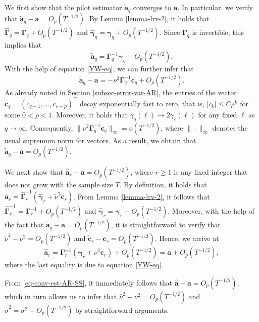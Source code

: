We first show that the pilot estimator $\widetilde{\boldsymbol{a}}_q$ converges to $\boldsymbol{a}$. In particular, we verify that $\widetilde{\boldsymbol{a}}_q - \boldsymbol{a} = O_p(T^{-1/2})$. By Lemma \ref{lemma-lrv-2}, it holds that $\widehat{\boldsymbol{\Gamma}}_q = \boldsymbol{\Gamma}_q + O_p(T^{-1/2})$ and $\widehat{\boldsymbol{\gamma}}_q = \boldsymbol{\gamma}_q + O_p(T^{-1/2})$. Since $\boldsymbol{\Gamma}_q$ is invertible, this implies that 
\[ \widetilde{\boldsymbol{a}}_q = \boldsymbol{\Gamma}_q^{-1} \boldsymbol{\gamma}_q + O_p(T^{-1/2}). \]
With the help of equation \eqref{YW-eq}, we can further infer that 
\[ \widetilde{\boldsymbol{a}}_q - \boldsymbol{a} = -\nu^2 \boldsymbol{\Gamma}_q^{-1} \boldsymbol{c}_q + O_p(T^{-1/2}). \]
As already noted in Section \ref{subsec-error-var-AR}, the entries of the vector $\boldsymbol{c}_q = (c_{q-1},\ldots,c_{c-p})^\top$ decay exponentially fast to zero, that is, $|c_k| \le C \rho^k$ for some $0 < \rho < 1$. Moreover, it holds that $\gamma_q(\ell) \rightarrow 2 \gamma_\varepsilon(\ell)$ for any fixed $\ell$ as $q \rightarrow \infty$. Consequently, $\| \nu^2 \boldsymbol{\Gamma}_q^{-1} \boldsymbol{c}_q \|_\infty = o(T^{-1/2})$, where $\| \cdot \|_\infty$ denotes the usual supremum norm for vectors. As a result, we obtain that $\widetilde{\boldsymbol{a}}_q - \boldsymbol{a} = O_p(T^{-1/2})$.  
  

We next show that $\widehat{\boldsymbol{a}}_r - \boldsymbol{a} = O_p(T^{-1/2})$, where $r \ge 1$ is any fixed integer that does not grow with the sample size $T$. By definition, it holds that $\widehat{\boldsymbol{a}}_r = \widehat{\boldsymbol{\Gamma}}_r^{-1} (\widehat{\boldsymbol{\gamma}}_r + \widetilde{\nu}^2 \widetilde{\boldsymbol{c}}_r)$.  From Lemma \ref{lemma-lrv-2}, it follows that $\widehat{\boldsymbol{\Gamma}}_r^{-1} = \boldsymbol{\Gamma}_r^{-1} + O_p(T^{-1/2})$ and $\widehat{\boldsymbol{\gamma}}_r = \boldsymbol{\gamma}_r + O_p(T^{-1/2})$. Moreover, with the help of the fact that $\widetilde{\boldsymbol{a}}_q - \boldsymbol{a} = O_p(T^{-1/2})$, it is straightforward to verify that $\widetilde{\nu}^2 - \nu^2 = O_p(T^{-1/2})$ and $\widetilde{\boldsymbol{c}}_r - \boldsymbol{c}_r =  O_p(T^{-1/2})$. Hence, we arrive at  
\begin{equation}\label{eq-conv-est-AR-SS}
\widehat{\boldsymbol{a}}_r = \boldsymbol{\Gamma}_r^{-1} (\boldsymbol{\gamma}_r + \nu^2 \boldsymbol{c}_r) + O_p(T^{-1/2}) = \boldsymbol{a} + O_p(T^{-1/2}), 
\end{equation}
where the last equality is due to equation \eqref{YW-eq}.


From \eqref{eq-conv-est-AR-SS}, it immediately follows that $\widehat{\boldsymbol{a}} - \boldsymbol{a} = O_p(T^{-1/2})$, which in turn allows us to infer that $\widehat{\nu}^2 - \nu^2 = O_p(T^{-1/2})$ and $\widehat{\sigma}^2 = \sigma^2 + O_p(T^{-1/2})$ by straightforward arguments. 



